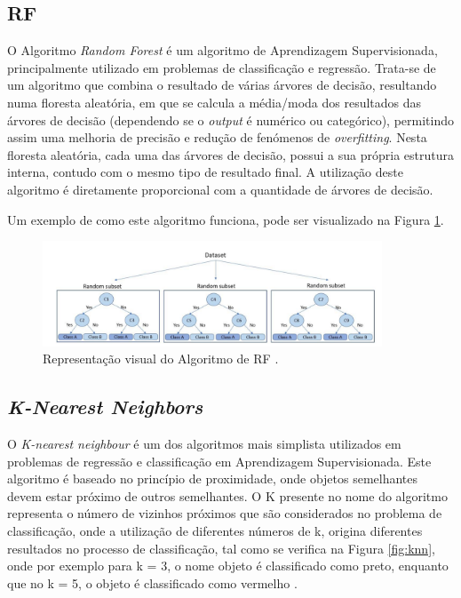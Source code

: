 \documentclass[12pt,a4paper,twoside]{report}
\begin{document}
{\subsection{\gls{RF}}

O Algoritmo \textit{Random Forest} é um algoritmo de Aprendizagem Supervisionada, principalmente utilizado em problemas de classificação e regressão. Trata-se de um algoritmo que combina o resultado de várias árvores de decisão, resultando numa floresta aleatória, em que se calcula a média/moda dos resultados das árvores de decisão (dependendo se o \textit{output} é numérico ou categórico), permitindo assim uma melhoria de precisão e redução de fenómenos de \textit{overfitting}. Nesta floresta aleatória, cada uma das árvores de decisão, possui a sua própria estrutura interna, contudo com o mesmo tipo de resultado final. A utilização deste algoritmo é diretamente proporcional com a quantidade de árvores de decisão.

Um exemplo de como este algoritmo funciona, pode ser visualizado na Figura \ref{fig:randomforest}.

\begin{figure}[H]
    \centering
    \includegraphics[width=0.9\textwidth]{imagens/randomforest.png}
    \caption{Representação visual do Algoritmo de \gls{RF} \cite{Uddin2019ComparingDS}.}
    \label{fig:randomforest}
\end{figure}


\subsection{\textit{K-Nearest Neighbors}}

O \textit{K-nearest neighbour} é um dos algoritmos mais simplista utilizados em problemas de regressão e classificação em Aprendizagem Supervisionada. Este algoritmo é baseado no princípio de proximidade, onde objetos semelhantes devem estar próximo de outros semelhantes. O K presente no nome do algoritmo representa o número de vizinhos próximos que são considerados no problema de classificação, onde a utilização de diferentes números de k, origina diferentes resultados no processo de classificação, tal como se verifica na Figura \ref{fig:knn}, onde por exemplo para k = 3, o nome objeto é classificado como preto, enquanto que no k = 5, o objeto é classificado como vermelho \cite{Uddin2019ComparingDS}.

}
\end{document}
